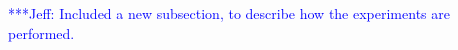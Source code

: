 \documentclass[conference,final]{IEEEtran}
\newcommand{\skonote}[1]{ {\textcolor{blue} { ***Jeff: #1 }}}
\newcommand{\skonote}[1]{}
\begin{document}
\skonote{Included a new subsection, to describe how the experiments are performed.}
\end{document}
